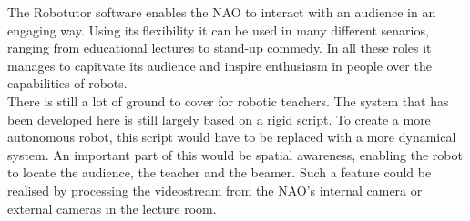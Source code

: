 The Robotutor software enables the NAO to interact with an audience in an engaging way. Using its flexibility it can be used in many different senarios, ranging from educational lectures to stand-up commedy. In all these roles it manages to capitvate its audience and inspire enthusiasm in people over the capabilities of robots.\\

There is still a lot of ground to cover for robotic teachers. The system that has been developed here is still largely based on a rigid script. To create a more autonomous robot, this script would have to be replaced with a more dynamical system. An important part of this would be spatial awareness, enabling the robot to locate the audience, the teacher and the beamer. Such a feature could be realised by processing the videostream from the NAO's internal camera or external cameras in the lecture room.